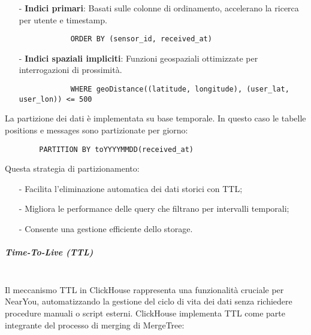 \documentclass[10pt]{article}
\newcommand{\mysubparagraph}[1]{\subparagraph{#1}\mbox{}\\}
\begin{document}
        \begin{itemize}
            \item[-] \textbf{Indici primari}: Basati sulle colonne di ordinamento, accelerano la ricerca per utente e timestamp.
            \begin{lstlisting}
            ORDER BY (sensor_id, received_at)
            \end{lstlisting}
            
            \item[-] \textbf{Indici spaziali impliciti}: Funzioni geospaziali ottimizzate per interrogazioni di prossimità.
            \begin{lstlisting}
            WHERE geoDistance((latitude, longitude), (user_lat, user_lon)) <= 500
            \end{lstlisting}
        \end{itemize}
        
        La partizione dei dati è implementata su base temporale. In questo caso le tabelle positions e messages sono partizionate per giorno:
        \begin{lstlisting}
        PARTITION BY toYYYYMMDD(received_at)
        \end{lstlisting}
            
            Questa strategia di partizionamento:
            \begin{itemize}
                \item[-] Facilita l'eliminazione automatica dei dati storici con TTL;
                \item[-] Migliora le performance delle query che filtrano per intervalli temporali;
                \item[-] Consente una gestione efficiente dello storage.
            \end{itemize}
        
        \mysubparagraph{Time-To-Live (TTL)}
        Il meccanismo TTL in ClickHouse rappresenta una funzionalità cruciale per NearYou, automatizzando la gestione del ciclo di vita dei dati senza richiedere procedure manuali o script esterni. ClickHouse implementa TTL come parte integrante del processo di merging di MergeTree:
        
\end{document}
